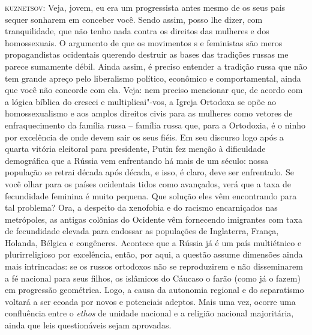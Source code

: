 \textsc{kuznetsov:} Veja, jovem, eu era um progressista antes mesmo de
os seus pais sequer sonharem em conceber você. Sendo assim, posso lhe
dizer, com tranquilidade, que não tenho nada contra os direitos das
mulheres e dos homossexuais. O argumento de que os movimentos s e
feministas são meros propagandistas ocidentais querendo destruir as
bases das tradições russas me parece sumamente débil. Ainda assim, é
preciso entender a tradição russa que não tem grande apreço pelo
liberalismo político, econômico e comportamental, ainda que você não
concorde com ela. Veja: nem preciso mencionar que, de acordo com a
lógica bíblica do crescei e multiplicai"-vos, a Igreja Ortodoxa se opõe
ao homossexualismo e aos amplos direitos civis para as mulheres como
vetores de enfraquecimento da família russa -- família russa que, para a
Ortodoxia, é o ninho por excelência de onde devem sair os seus fiéis. Em
seu discurso logo após a quarta vitória eleitoral para presidente, Putin
fez menção à dificuldade demográfica que a Rússia vem enfrentando há
mais de um século: nossa população se retrai década após década, e isso,
é claro, deve ser enfrentado. Se você olhar para os países ocidentais
tidos como avançados, verá que a taxa de fecundidade feminina é muito
pequena. Que solução eles vêm encontrando para tal problema? Ora, a
despeito da xenofobia e do racismo encarniçados nas metrópoles, as
antigas colônias do Ocidente vêm fornecendo imigrantes com taxa de
fecundidade elevada para endossar as populações de Inglaterra, França,
Holanda, Bélgica e congêneres. Acontece que a Rússia já é um país
multiétnico e plurirreligioso por excelência, então, por aqui, a questão
assume dimensões ainda mais intrincadas: se os russos ortodoxos não se
reproduzirem e não disseminarem a fé nacional para seus filhos, os
islâmicos do Cáucaso o farão (como já o fazem) em progressão geométrica.
Logo, a causa da autonomia regional e do separatismo voltará a ser
ecoada por novos e potenciais adeptos. Mais uma vez, ocorre uma
confluência entre o \emph{ethos} de unidade nacional e a religião
nacional majoritária, ainda que leis questionáveis sejam aprovadas.

